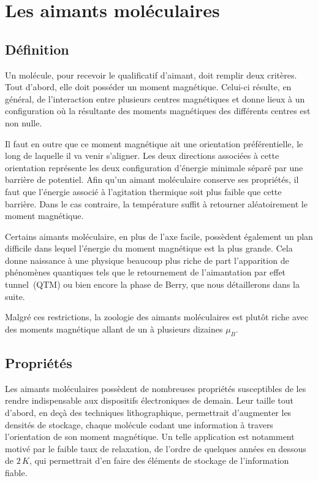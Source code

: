 \section{Les aimants moléculaires}
\subsection{Définition}

Un molécule, pour recevoir le qualificatif d'aimant, doit remplir deux critères. Tout d'abord, elle doit posséder un moment magnétique. Celui-ci résulte, en général, de l'interaction entre plusieurs centres magnétiques et donne lieux à un configuration où la résultante des moments magnétiques des différents centres est non nulle. 

Il faut en outre que ce moment magnétique ait une orientation préférentielle, le long de laquelle il va venir s'aligner. Les deux directions associées à cette orientation représente les deux configuration d'énergie minimale séparé par une barrière de potentiel. Afin qu'un aimant moléculaire conserve ses propriétés, il faut que l'énergie associé à l'agitation thermique soit plus faible que cette barrière. Dans le cas contraire, la température suffit à retourner aléatoirement le moment magnétique.

Certains aimants moléculaire, en plus de l'axe facile, possèdent également un plan difficile dans lequel l'énergie du moment magnétique est la plus grande. Cela donne naissance à une physique beaucoup plus riche de part l'apparition de phénomènes quantiques tels que le retournement de l'aimantation par effet tunnel~(QTM) ou bien encore la phase de Berry, que nous détaillerons dans la suite.

Malgré ces restrictions, la zoologie des aimants moléculaires est plutôt riche avec des moments magnétique allant de un à plusieurs dizaines $\mu_B$.


\subsection{Propriétés}
Les aimants moléculaires possèdent de nombreuses propriétés susceptibles de les rendre indispensable aux dispositifs électroniques de demain. Leur taille tout d'abord, en deçà des techniques lithographique, permettrait d'augmenter les densités de stockage, chaque molécule codant une information à travers l'orientation de son moment magnétique. Un telle application est notamment motivé par le faible taux de relaxation, de l'ordre de quelques années en dessous de $2\,K$, qui permettrait d'en faire des éléments de stockage de l'information fiable.


